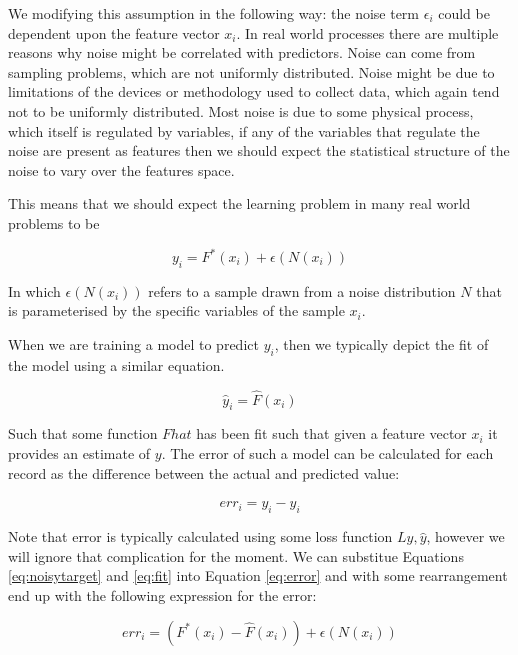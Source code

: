 \documentclass[11pt,twoside,a4paper]{article}
\begin{document}
We modifying this assumption in the following way: the noise term $\epsilon_i$ could be dependent upon the
feature vector $x_i$. In real world processes there are multiple reasons
why noise might be correlated with predictors. Noise can come from sampling problems,
which are not uniformly distributed. Noise might be due to limitations of the devices
or methodology used to collect data, which again tend not to be uniformly distributed.
Most noise is due to some physical process, which itself is regulated by variables,
if any of the variables that regulate the noise are present as features then we should
expect the statistical structure of the noise to vary over the features space.

This means that we should expect the learning problem in many real world problems to be

\begin{equation}
y_i = F^*(x_i) + \epsilon(N(x_i))
\label{eq:noisytarget}
\end{equation}

In which $\epsilon(N(x_i))$ refers to a sample drawn from a noise distribution $N$ that is
parameterised by the specific variables of the sample $x_i$.

When we are training a model to predict $y_i$, then we typically depict the fit of the model
using a similar equation.

\begin{equation}
\hat{y}_i = \hat{F}(x_i)
\label{eq:fit}
\end{equation}

Such that some function $Fhat$ has been fit such that given a feature vector $x_i$ it provides an estimate of $y$.
The error of such a model can be calculated for each record as the difference between the actual and predicted value:

\begin{equation}
err_i = y_i - \hat{y}_i
\label{eq:error}
\end{equation}

Note that error is typically calculated using some loss function $L{y,\hat{y}}$, however we will ignore that complication for the moment. 
We can substitue Equations \ref{eq:noisytarget} and \ref{eq:fit} into Equation \ref{eq:error} and with some rearrangement end up
with the following expression for the error:

\begin{equation}
err_i = ( F^*(x_i) - \hat{F}(x_i) )  + \epsilon(N(x_i))
\label{eq:noisyerror}
\end{equation}
\end{document}
